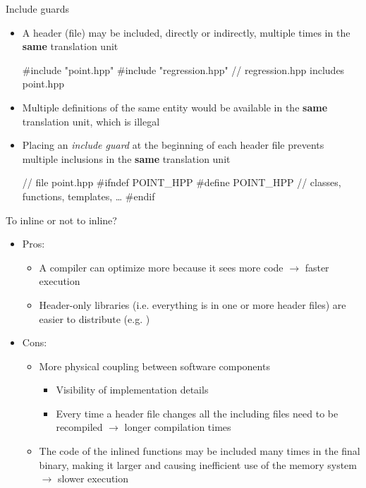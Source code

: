 \begin{frame}[fragile]{Include guards}

  \begin{itemize}[<+->]
  \item A header (file) may be included, directly or indirectly, multiple times
    in the \textbf{same} translation unit
    \begin{codeblock}
#include "point.hpp"
#include "regression.hpp" // regression.hpp includes point.hpp\end{codeblock}

  \item Multiple definitions of the same entity would be available in the
    \textbf{same} translation unit, which is illegal
  \item Placing an \textit{include guard} at the beginning of each header file
    prevents multiple inclusions in the \textbf{same} translation unit
    \begin{codeblock}
// file point.hpp
#ifndef POINT_HPP
#define POINT_HPP
\ddd
// classes, functions, templates, \ldots
\ddd
#endif\end{codeblock}
  \end{itemize}
\end{frame}

\begin{frame}{To inline or not to inline?}

  \begin{itemize}
  \item Pros:
    \begin{itemize}
    \item A compiler can optimize more because it sees more code $\rightarrow$
      faster execution
    \item Header-only libraries (i.e. everything is in one or more header files)
      are easier to distribute (e.g. )
    \end{itemize}
  \item Cons:
    \begin{itemize}
    \item More physical coupling between software components
      \begin{itemize}
      \item Visibility of implementation details
      \item Every time a header file changes all the including files need to be
        recompiled $\rightarrow$ longer compilation times
      \end{itemize}
    \item The code of the inlined functions may be included many times in the
      final binary, making it larger and causing inefficient use of the memory
      system $\rightarrow$ slower execution
    \end{itemize}
  \end{itemize}

\end{frame}

